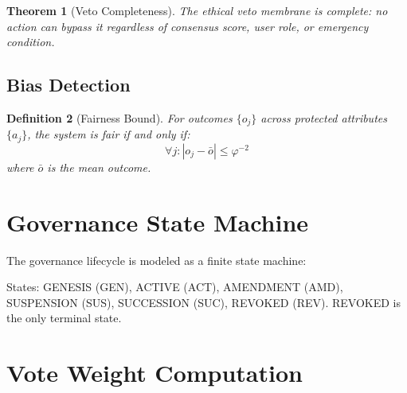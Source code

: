 \documentclass[11pt,twocolumn]{article}
\newtheorem{theorem}{Theorem}
\newtheorem{definition}[theorem]{Definition}
\begin{document}
\begin{theorem}[Veto Completeness]
The ethical veto membrane is \textit{complete}: no action can bypass it
regardless of consensus score, user role, or emergency condition.
\end{theorem}

\subsection{Bias Detection}

\begin{definition}[Fairness Bound]
For outcomes $\{o_j\}$ across protected attributes $\{a_j\}$, the system
is fair if and only if:
\begin{equation}
\forall j: |o_j - \bar{o}| \leq \varphi^{-2}
\end{equation}
where $\bar{o}$ is the mean outcome.
\end{definition}

\section{Governance State Machine}

The governance lifecycle is modeled as a finite state machine:

\begin{center}
\end{center}

States: GENESIS (GEN), ACTIVE (ACT), AMENDMENT (AMD), SUSPENSION (SUS),
SUCCESSION (SUC), REVOKED (REV). REVOKED is the only terminal state.

\section{Vote Weight Computation}
\end{document}
